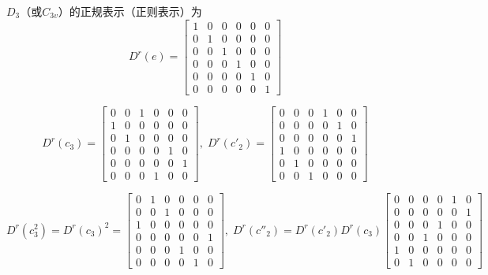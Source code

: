 \documentclass[12pt]{article}
\numberwithin{equation}{section}	 %
\begin{document}
\begin{spacing}{1.5}
$D_{3}$（或$C_{3v}$）的正规表示（正则表示）为
\begin{equation}
D^{r}(e)=\left[\begin{matrix} 1 & 0 & 0 & 0 & 0 & 0 \\ 0 & 1 & 0 & 0 & 0 & 0 \\ 0 & 0  & 1 & 0 & 0 & 0 \\ 0 & 0 & 0 & 1 & 0 & 0 \\ 0 & 0 & 0 & 0 & 1 & 0 \\ 0 & 0 & 0 & 0 & 0 & 1 \end{matrix}\right]
\end{equation}

\begin{equation}
D^{r}(c_{3})=\left[\begin{matrix}0 & 0  & 1 & 0 & 0 & 0 \\ 1 & 0 & 0 & 0 & 0 & 0 \\ 0 & 1 & 0 & 0 & 0 & 0 \\ 0 & 0 & 0 & 0 & 1 & 0 \\ 0 & 0 & 0 & 0 & 0 & 1 \\ 0 & 0 & 0 &1 & 0 & 0 \end{matrix}\right], \;
D^{r}(c'_{2})=\left[\begin{matrix} 0 & 0 & 0 &1 & 0 & 0 \\ 0 & 0 & 0 & 0 & 1 & 0 \\ 0 & 0 & 0 & 0 & 0 & 1\\ 1 & 0 & 0 & 0 & 0 & 0 \\ 0 & 1 & 0 & 0 & 0 & 0 \\ 0 & 0  & 1 & 0 & 0 & 0 \end{matrix}\right]
\end{equation}

\begin{equation}
D^{r}(c^{2}_{3}) = D^{r}(c_{3})^{2} = \left[\begin{matrix}0 & 1 & 0 & 0 & 0 & 0 \\ 0 & 0 & 1 & 0 & 0 & 0 \\ 1 & 0 & 0 & 0 & 0 & 0 \\ 0 & 0 & 0 & 0 & 0 & 1 \\ 0 & 0 & 0 & 1 & 0 & 0 \\ 0 & 0 & 0 & 0 & 1 & 0 \end{matrix}\right], \;
D^{r}(c''_{2}) = D^{r}(c'_{2}) D^{r}(c_{3}) \left[\begin{matrix}0 & 0 & 0 & 0 & 1 & 0 \\ 0 & 0 & 0 & 0 & 0 & 1 \\ 0 & 0 & 0 &1 & 0 & 0\\ 0 & 0  & 1 & 0 & 0 & 0 \\ 1 & 0 & 0 & 0 & 0 & 0 \\0 & 1 & 0 & 0 & 0 & 0 \end{matrix}\right]
\end{equation}


\end{spacing}
\end{document}
